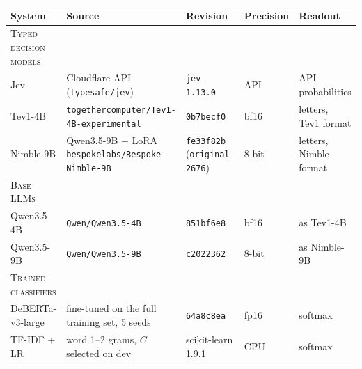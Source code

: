 \begin{tabular}{lllll}
\toprule
System & Source & Revision & Precision & Readout \\
\midrule
\textsc{Typed decision models} & & & & \\
Jev & Cloudflare API (\texttt{typesafe/jev}) & \texttt{jev-1.13.0} & API & API probabilities \\
Tev1-4B & \texttt{togethercomputer/Tev1-4B-experimental} & \texttt{0b7becf0} & bf16 & letters, Tev1 format \\
Nimble-9B & \makecell[l]{Qwen3.5-9B + LoRA \\ \texttt{bespokelabs/Bespoke-Nimble-9B}} & \makecell[l]{\texttt{fe33f82b} \\ (\texttt{original-2676})} & 8-bit & letters, Nimble format \\
\midrule
\textsc{Base LLMs} & & & & \\
Qwen3.5-4B & \texttt{Qwen/Qwen3.5-4B} & \texttt{851bf6e8} & bf16 & as Tev1-4B \\
Qwen3.5-9B & \texttt{Qwen/Qwen3.5-9B} & \texttt{c2022362} & 8-bit & as Nimble-9B \\
\midrule
\textsc{Trained classifiers} & & & & \\
DeBERTa-v3-large & fine-tuned on the full training set, 5 seeds & \texttt{64a8c8ea} & fp16 & softmax \\
TF-IDF + LR & word 1--2 grams, $C$ selected on dev & scikit-learn 1.9.1 & CPU & softmax \\
\bottomrule
\end{tabular}
